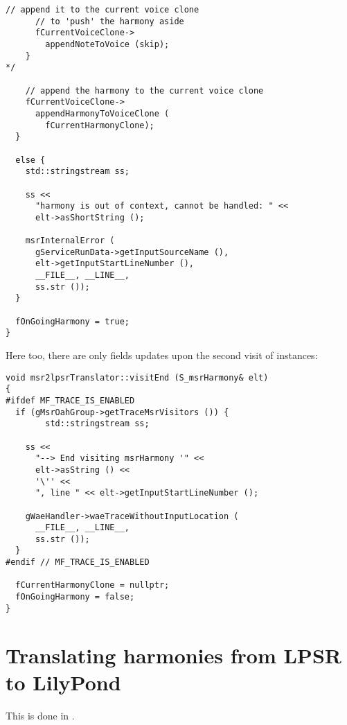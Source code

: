 \begin{lstlisting}[language=CPlusPlus]
      // append it to the current voice clone
      // to 'push' the harmony aside
      fCurrentVoiceClone->
        appendNoteToVoice (skip);
    }
*/

    // append the harmony to the current voice clone
    fCurrentVoiceClone->
      appendHarmonyToVoiceClone (
        fCurrentHarmonyClone);
  }

  else {
    std::stringstream ss;

    ss <<
      "harmony is out of context, cannot be handled: " <<
      elt->asShortString ();

    msrInternalError (
      gServiceRunData->getInputSourceName (),
      elt->getInputStartLineNumber (),
      __FILE__, __LINE__,
      ss.str ());
  }

  fOnGoingHarmony = true;
}
\end{lstlisting}

\pagebreak

Here too, there are only fields updates upon the second visit of  instances:
\begin{lstlisting}[language=CPlusPlus]
void msr2lpsrTranslator::visitEnd (S_msrHarmony& elt)
{
#ifdef MF_TRACE_IS_ENABLED
  if (gMsrOahGroup->getTraceMsrVisitors ()) {
		std::stringstream ss;

    ss <<
      "--> End visiting msrHarmony '" <<
      elt->asString () <<
      '\'' <<
      ", line " << elt->getInputStartLineNumber ();

    gWaeHandler->waeTraceWithoutInputLocation (
      __FILE__, __LINE__,
      ss.str ());
  }
#endif // MF_TRACE_IS_ENABLED

  fCurrentHarmonyClone = nullptr;
  fOnGoingHarmony = false;
}
\end{lstlisting}


\section{Translating harmonies from LPSR to LilyPond}

This is done in \lpsrToLilypond{}.

